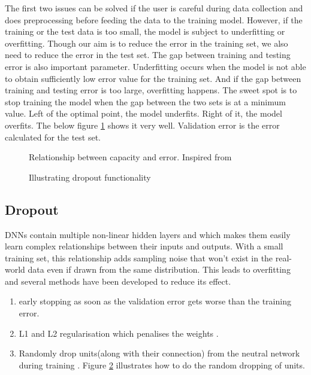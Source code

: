 The first two issues can be solved if the user is careful during data collection and does
preprocessing before feeding the data to the training model. However, if the training or
the test data is too small, the model is subject to underfitting or overfitting. Though
our aim is to reduce the error in the training set, we also need to reduce the error in
the test set. The gap between training and testing error is also important parameter.
Underfitting occurs when the model is not able to obtain sufficiently low error value for
the training set. And if the gap between training and testing error is too large,
overfitting happens. The sweet spot is to stop training the model when the gap between the
two sets is at a minimum value. \label{inside:formodelcheckpoint} Left of the optimal point, the model underfits. Right of
it, the model overfits. The below figure \ref{fig:overfittingunderfitting} shows it very
well. Validation error is the error calculated for the test set.
\begin{figure}[h]
	\centering
    \def\svgwidth{0.75\textwidth}
    \caption{Relationship between capacity and error. Inspired from
    \cite{Goodfellow-et-al-2016}}
    \label{fig:overfittingunderfitting}
\end{figure}


\begin{figure}[h]
	\centering
    \def\svgwidth{0.5\textwidth}
    
    \caption{Illustrating dropout functionality}
    \label{fig:Dropout_function}
\end{figure}

\subsection{Dropout}
DNNs contain multiple non-linear hidden layers and which makes them easily learn
complex relationships between their inputs and outputs. With a small training set, this
relationship adds sampling noise that won't exist in the real-world data even if drawn
from the same distribution. This leads to overfitting and several methods have been
developed to reduce its effect.
\begin{enumerate}
    \item early stopping as soon as the validation error gets worse than the training
        error. \label{item:earlystopping}
    \item L1 and L2 regularisation which penalises the weights \cite{Schmidhuber_2015}.
    \item Randomly drop units(along with their connection) from the neutral network during
        training \cite{dropoutpaper}. Figure \ref{fig:Dropout_function} illustrates how to
        do the random dropping of units.
    \end{enumerate}


